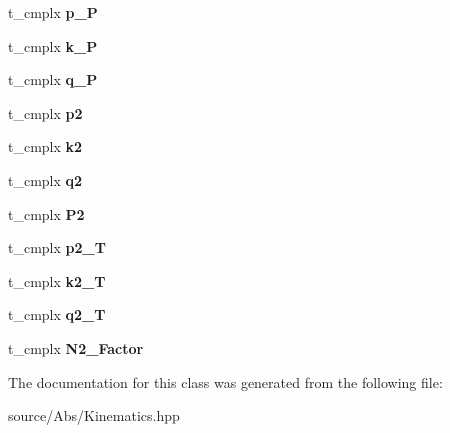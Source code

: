 \begin{DoxyCompactItemize}
\item 
\hypertarget{class_c___kinematics__1loop_a16c83ab6f2b880b6642d7bfde3f664ec}{t\-\_\-cmplx {\bfseries p\-\_\-\-P}}\label{class_c___kinematics__1loop_a16c83ab6f2b880b6642d7bfde3f664ec}

\item 
\hypertarget{class_c___kinematics__1loop_a7c8dbeaa212afb08d32d7aa2b5effc00}{t\-\_\-cmplx {\bfseries k\-\_\-\-P}}\label{class_c___kinematics__1loop_a7c8dbeaa212afb08d32d7aa2b5effc00}

\item 
\hypertarget{class_c___kinematics__1loop_a073860fdef9170dfd10d125811d245a3}{t\-\_\-cmplx {\bfseries q\-\_\-\-P}}\label{class_c___kinematics__1loop_a073860fdef9170dfd10d125811d245a3}

\item 
\hypertarget{class_c___kinematics__1loop_aeaa8b30330959af96ffee0dd8c545dc0}{t\-\_\-cmplx {\bfseries p2}}\label{class_c___kinematics__1loop_aeaa8b30330959af96ffee0dd8c545dc0}

\item 
\hypertarget{class_c___kinematics__1loop_aaf7a5dc2be4002c455d5bccbe4914c4a}{t\-\_\-cmplx {\bfseries k2}}\label{class_c___kinematics__1loop_aaf7a5dc2be4002c455d5bccbe4914c4a}

\item 
\hypertarget{class_c___kinematics__1loop_aac076faa327bf22e32ccf0123cb45636}{t\-\_\-cmplx {\bfseries q2}}\label{class_c___kinematics__1loop_aac076faa327bf22e32ccf0123cb45636}

\item 
\hypertarget{class_c___kinematics__1loop_a7dff81ad45ed5e4ea26244490912c52c}{t\-\_\-cmplx {\bfseries P2}}\label{class_c___kinematics__1loop_a7dff81ad45ed5e4ea26244490912c52c}

\item 
\hypertarget{class_c___kinematics__1loop_a384d988f7c660f8cb04a2eb3377084a2}{t\-\_\-cmplx {\bfseries p2\-\_\-\-T}}\label{class_c___kinematics__1loop_a384d988f7c660f8cb04a2eb3377084a2}

\item 
\hypertarget{class_c___kinematics__1loop_ae2ed8d22f5cc5340e4f59c708194169f}{t\-\_\-cmplx {\bfseries k2\-\_\-\-T}}\label{class_c___kinematics__1loop_ae2ed8d22f5cc5340e4f59c708194169f}

\item 
\hypertarget{class_c___kinematics__1loop_a5380c55913e80399964c32a5fe456dd7}{t\-\_\-cmplx {\bfseries q2\-\_\-\-T}}\label{class_c___kinematics__1loop_a5380c55913e80399964c32a5fe456dd7}

\item 
\hypertarget{class_c___kinematics__1loop_a33b6f88ce54ff6dfd7342d75974b91e1}{t\-\_\-cmplx {\bfseries N2\-\_\-\-Factor}}\label{class_c___kinematics__1loop_a33b6f88ce54ff6dfd7342d75974b91e1}

\end{DoxyCompactItemize}


The documentation for this class was generated from the following file\-:\begin{DoxyCompactItemize}
\item 
source/\-Abs/Kinematics.\-hpp\end{DoxyCompactItemize}

